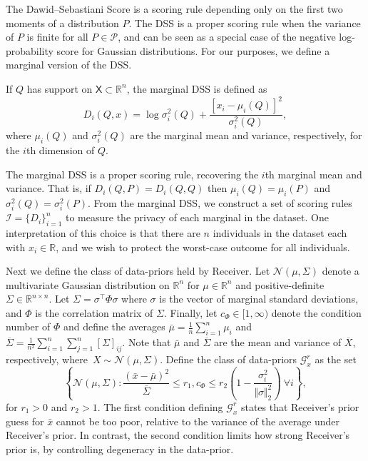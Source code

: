 \documentclass{article}
\theoremstyle{plain}
\theoremstyle{plain}
\theoremstyle{definition}
\theoremstyle{remark}
\theoremstyle{plain}
\begin{document}
The Dawid--Sebastiani Score \citep[DSS,][]{dawid1999coherent} is a scoring rule depending only on the first two moments of a distribution $P$. The DSS is a proper scoring rule when the variance of $P$ is finite for all $P \in \mathcal{P}$, and can be seen as a special case of the negative log-probability score for Gaussian distributions. For our purposes, we define a marginal version of the DSS.  
\begin{definition}
    If $Q$ has support on $\mathsf{X} \subset \mathbb{R}^n$, the marginal DSS is defined as 
    \begin{equation*}
        D_i(Q,x) = \log \sigma^2_i(Q) + \frac{[x_i - \mu_i(Q)]^2}{\sigma^{2}_i(Q)},
    \end{equation*}
    where $\mu_i(Q)$ and $\sigma^2_i(Q)$ are the marginal mean and variance, respectively, for the $i$th dimension of $Q$.
\end{definition}
The marginal DSS is a proper scoring rule, recovering the $i$th marginal mean and variance. That is, if $D_i(Q,P) = D_i(Q,Q)$ then $\mu_i(Q) = \mu_i(P)$ and $\sigma^2_i(Q) = \sigma^2_i(P)$. From the marginal DSS, we construct a set of scoring rules $\mathcal{I} = \{D_i\}_{i=1}^n$ to measure the privacy of each marginal in the dataset. One interpretation of this choice is that there are $n$ individuals in the dataset each with $x_i\in \mathbb{R}$, and we wish to protect the worst-case outcome for all individuals.

Next we define the class of data-priors held by Receiver. Let $\mathcal{N}(\mu,\Sigma)$ denote a multivariate Gaussian distribution on $\mathbb{R}^n$ for $\mu \in \mathbb{R}^n$ and positive-definite $\Sigma \in \mathbb{R}^{n\times n}$. Let $\Sigma = \sigma^\top \Phi \sigma$ where $\sigma$ is the vector of marginal standard deviations, and $\Phi$ is the correlation matrix of $\Sigma$. Finally, let $c_\Phi \in [1,\infty)$ denote the condition number of $\Phi$ and define the averages $\bar{\mu} = \frac{1}{n}\sum_{i=1}^n \mu_i$ and $\overline{\Sigma} = \frac{1}{n^2}\sum_{i=1}^{n} \sum_{j=1}^{n} [\Sigma]_{ij}$. Note that $\bar{\mu}$ and $\overline{\Sigma}$ are the mean and variance of $\overline{X}$, respectively, where~$X \sim \mathcal{N}(\mu,\Sigma)$. Define the class of data-priors $\mathcal{G}_{x}^{r}$ as the set
\begin{equation*}
    \left\{ \mathcal{N}(\mu,\Sigma): \frac{(\bar{x}-\bar{\mu})^2}{\overline{\Sigma}} \leq r_1 , c_\Phi \leq r_2 \left(1- \frac{\sigma_i^2}{\Vert\sigma \Vert_2^2} \right)~\forall i \right\},
\end{equation*}
for $r_1 > 0$ and $r_2 > 1$. 
The first condition defining $\mathcal{G}_{x}^{r}$ states that Receiver's prior guess for $\bar{x}$ cannot be too poor, relative to the variance of the average under Receiver's prior. In contrast, the second condition limits how strong Receiver's prior is, by controlling degeneracy in the data-prior.
\end{document}
